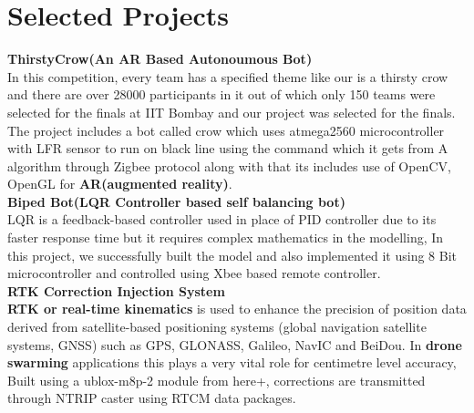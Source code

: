 \documentclass[10pt]{report}
\begin{document}
\section*{\color{BlueViolet}\faLaptop\hspace{1pt} Selected Projects}
\vspace{-1em}\noindent\textbf{\large ThirstyCrow(An AR Based Autonoumous Bot)\\[1pt]}
In this competition, every team has a specified theme like our is a thirsty crow and there are over 28000 participants in it out of which only 150 teams were selected for the finals at IIT Bombay and our project was selected for the finals. The project includes a bot called crow which uses atmega2560 microcontroller with LFR sensor to run on black line using the command which it gets from A\* algorithm through Zigbee protocol along with that its includes use of OpenCV, OpenGL for \textbf{AR(augmented reality)}.
\\[4pt] 
\noindent\textbf{\large Biped Bot(LQR Controller based self balancing bot)\\[1pt]}
LQR is a feedback-based controller used in place of PID controller due to its faster response time but it requires complex mathematics in the modelling, In this project, we successfully built the model and also implemented it using 8 Bit microcontroller and controlled using Xbee based remote controller.
\\[4pt] 
\noindent\textbf{\large RTK Correction Injection System\\[1pt]}
\textbf{RTK or real-time kinematics} is used to enhance the precision of position data derived from satellite-based positioning systems (global navigation satellite systems, GNSS) such as GPS, GLONASS, Galileo, NavIC and BeiDou. In \textbf{drone swarming} applications this plays a very vital role for centimetre level accuracy, Built using a ublox-m8p-2 module from here+, corrections are transmitted through NTRIP caster using RTCM data packages.
\\[4pt]
\end{document}
